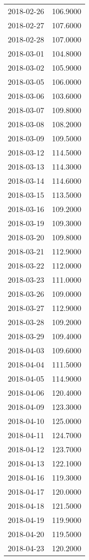 \begin{tabular}{lr}
2018-02-26 &    106.9000 \\
2018-02-27 &    107.6000 \\
2018-02-28 &    107.0000 \\
2018-03-01 &    104.8000 \\
2018-03-02 &    105.9000 \\
2018-03-05 &    106.0000 \\
2018-03-06 &    103.6000 \\
2018-03-07 &    109.8000 \\
2018-03-08 &    108.2000 \\
2018-03-09 &    109.5000 \\
2018-03-12 &    114.5000 \\
2018-03-13 &    114.3000 \\
2018-03-14 &    114.6000 \\
2018-03-15 &    113.5000 \\
2018-03-16 &    109.2000 \\
2018-03-19 &    109.3000 \\
2018-03-20 &    109.8000 \\
2018-03-21 &    112.9000 \\
2018-03-22 &    112.0000 \\
2018-03-23 &    111.0000 \\
2018-03-26 &    109.0000 \\
2018-03-27 &    112.9000 \\
2018-03-28 &    109.2000 \\
2018-03-29 &    109.4000 \\
2018-04-03 &    109.6000 \\
2018-04-04 &    111.5000 \\
2018-04-05 &    114.9000 \\
2018-04-06 &    120.4000 \\
2018-04-09 &    123.3000 \\
2018-04-10 &    125.0000 \\
2018-04-11 &    124.7000 \\
2018-04-12 &    123.7000 \\
2018-04-13 &    122.1000 \\
2018-04-16 &    119.3000 \\
2018-04-17 &    120.0000 \\
2018-04-18 &    121.5000 \\
2018-04-19 &    119.9000 \\
2018-04-20 &    119.5000 \\
2018-04-23 &    120.2000 \\

\end{tabular}
